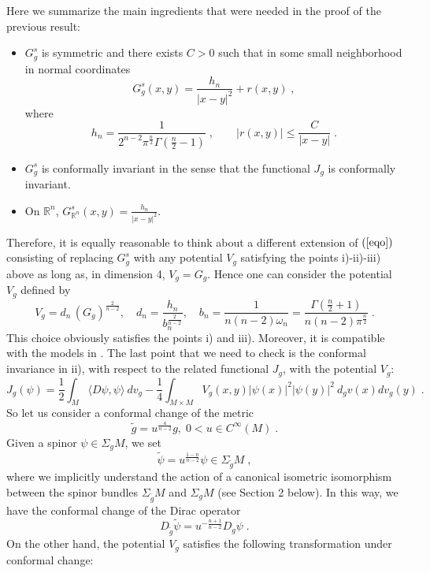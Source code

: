 \documentclass[11pt]{article}
\def \R {\mathbb{R}}
\begin{document}
{\noindent
Here we summarize the main ingredients that were needed in the proof of the previous result:
\begin{itemize}
\item[i)] $G_{g}^{s}$ is symmetric and there exists $C > 0$ such that in some small neighborhood in normal coordinates 
$$G_{g}^{s}(x,y)=\frac{h_{n}}{|x-y|^{2}}+r(x,y) \;, $$
where
$$h_{n}=\frac{1}{2^{n-2}\pi^{\frac{n}{2}}\Gamma(\frac{n}{2}-1)}\; , \qquad |r(x,y)|\leq \frac{C}{|x-y|} \; .$$
\item[ii)] $G_{g}^{s}$ is conformally invariant in the sense that the functional $J_{g}$ is conformally invariant.
\item[iii)] On $\R^{n}$, $G_{\R^{n}}^{s}(x,y)=\frac{h_{n}}{|x-y|^{2}}.$
\end{itemize}
Therefore, it is equally reasonable to think about a different extension of $(\ref{eqo})$ consisting of replacing $G^{s}_{g}$ with any potential $V_g$ satisfying the points i)-ii)-iii) above as long as, in dimension 4, $V_g=G_{g}$. Hence one can consider the potential $V_{g}$ defined by 
$$V_{g}=d_{n} \, (G_{{g}})^{\frac{2}{n-2}}, \quad d_{n}=\frac{h_{n}}{b_{n}^{\frac{2}{n-2}}}, \quad b_{n}=\frac{1}{n(n-2)\omega_{n}}=\frac{\Gamma(\frac{n}{2}+1)}{n(n-2)\pi^{\frac{n}{2}}} \; .$$
This choice obviously satisfies the points i) and iii). Moreover, it is compatible with the models in \cite{BGDB,DWX,ES,GG,Enno,Lieb1,Lieb2,MS}. The last point that we need to check is the conformal invariance in ii), with respect to the related functional $J_{g}$, with the potential $V_g$:
\begin{equation}\label{modifiedJg}
  J_{g}(\psi)=\frac{1}{2}\int_{M}\langle D \psi,\psi\rangle   \ dv_{g} -\frac{1}{4}\int_{M\times M} V_{g}(x,y)|\psi(x)|^{2} |\psi(y)|^{2} \ d_{g}v(x) dv_{g}(y) \; .
\end{equation}
So let us consider a conformal change of the metric
\begin{equation}\label{changemetric}
  \widetilde{g} = u^{\frac{4}{n-2}}g,  \; 0<u\in C^{\infty}(M) \; .
\end{equation}
Given a spinor $\psi \in \Sigma_{g} M$, we set 
$$\widetilde{\psi} = u^{\frac{1-n}{n-2}} \psi \in \Sigma_{\widetilde{g}} M \; ,$$
where we implicitly understand the action of a canonical isometric isomorphism between the spinor bundles $\Sigma_{\widetilde{g}} M$ and $\Sigma_{g} M$ (see Section 2 below). In this way, we have the conformal change of the Dirac operator
$$
D_{ \widetilde{g}}\widetilde{\psi}  = u^{-\frac{n+1}{n-2}} D_{g} \psi \; .
$$
On the other hand, the potential $V_{g}$ satisfies the following transformation under conformal change:
}
\end{document}
